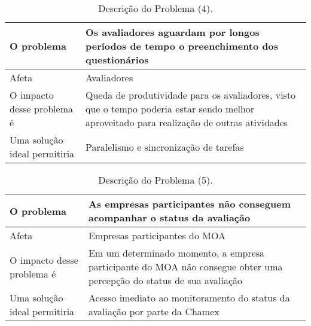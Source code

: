 \begin{table}[H]
	\centering
	\begin{tabular}{|p{6cm}|p{9cm}|}
	\hline
	O problema & Os avaliadores aguardam por longos períodos de tempo o preenchimento dos questionários \\ \hline
	Afeta & Avaliadores \\ \hline
	O impacto desse problema é & Queda de produtividade para os avaliadores, visto que o tempo poderia estar sendo melhor aproveitado para realização de outras atividades \\ \hline
	Uma solução ideal permitiria & Paralelismo e sincronização de tarefas \\ \hline
	\end{tabular}
	\label{tab:problemaQuatro}
	\caption[Descrição do Problema (4)]{Descrição do Problema (4).}
\end{table}
\begin{table}[H]
	\centering
	\begin{tabular}{|p{6cm}|p{9cm}|}
	\hline
	O problema & As empresas participantes não conseguem acompanhar o status da avaliação \\ \hline
	Afeta & Empresas participantes do MOA \\ \hline
	O impacto desse problema é & Em um determinado momento, a empresa participante do MOA não consegue obter uma percepção do status de sua avaliação \\ \hline
	Uma solução ideal permitiria & Acesso imediato ao monitoramento do status da avaliação por parte da Chamex \\ \hline
	\end{tabular}
	\label{tab:problemaCinco}
	\caption[Descrição do Problema (5)]{Descrição do Problema (5).}
\end{table}